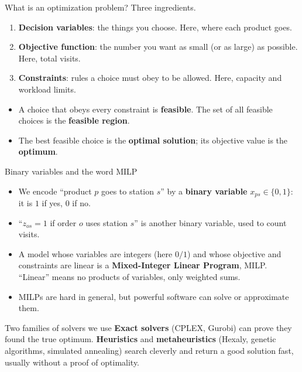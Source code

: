 \documentclass[11pt,aspectratio=169]{beamer}
\newcommand{\term}[1]{\textcolor{blue!60!black}{\textbf{#1}}}
\begin{document}
\begin{frame}{What is an optimization problem?}
  Three ingredients.
  \begin{enumerate}
    \item \term{Decision variables}: the things you choose. Here, where each product goes.
    \item \term{Objective function}: the number you want as small (or as large) as possible. Here, total visits.
    \item \term{Constraints}: rules a choice must obey to be allowed. Here, capacity and workload limits.
  \end{enumerate}
  \begin{itemize}
    \item A choice that obeys every constraint is \term{feasible}. The set of all feasible choices is the \term{feasible region}.
    \item The best feasible choice is the \term{optimal solution}; its objective value is the \term{optimum}.
  \end{itemize}
\end{frame}

\begin{frame}{Binary variables and the word MILP}
  \begin{itemize}
    \item We encode ``product $p$ goes to station $s$'' by a \term{binary variable} $x_{ps}\in\{0,1\}$: it is $1$ if yes, $0$ if no.
    \item ``$z_{os}=1$ if order $o$ uses station $s$'' is another binary variable, used to count visits.
    \item A model whose variables are integers (here $0/1$) and whose objective and constraints are linear is a \term{Mixed-Integer Linear Program}, MILP. ``Linear'' means no products of variables, only weighted sums.
    \item MILPs are hard in general, but powerful software can solve or approximate them.
  \end{itemize}
  \begin{block}{Two families of solvers we use}
  \term{Exact solvers} (CPLEX, Gurobi) can prove they found the true optimum. \term{Heuristics} and \term{metaheuristics} (Hexaly, genetic algorithms, simulated annealing) search cleverly and return a good solution fast, usually without a proof of optimality.
  \end{block}
\end{frame}
\end{document}
